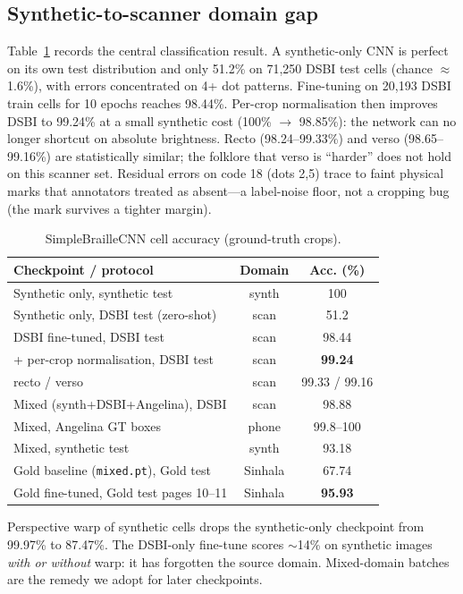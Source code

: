 \documentclass[conference]{IEEEtran}
\begin{document}
\subsection{Synthetic-to-scanner domain gap}
\label{sec:exp-dbsi}
Table~\ref{tab:cnn} records the central classification result. A
synthetic-only CNN is perfect on its own test distribution and only
51.2\% on 71{,}250 DSBI test cells (chance $\approx$1.6\%), with errors
concentrated on 4+ dot patterns. Fine-tuning on 20{,}193 DSBI train
cells for 10 epochs reaches 98.44\%. Per-crop normalisation then
improves DSBI to 99.24\% at a small synthetic cost (100\% $\rightarrow$
98.85\%): the network can no longer shortcut on absolute brightness.
Recto (98.24--99.33\%) and verso (98.65--99.16\%) are statistically
similar; the folklore that verso is ``harder'' does not hold on this
scanner set. Residual errors on code 18 (dots 2,5) trace to faint
physical marks that annotators treated as absent---a label-noise floor,
not a cropping bug (the mark survives a tighter margin).

\begin{table}[t]
\caption{SimpleBrailleCNN cell accuracy (ground-truth crops).}
\label{tab:cnn}
\centering
\begin{tabular}{lcc}
\toprule
Checkpoint / protocol & Domain & Acc. (\%) \\
\midrule
Synthetic only, synthetic test & synth & 100 \\
Synthetic only, DSBI test (zero-shot) & scan & 51.2 \\
DSBI fine-tuned, DSBI test & scan & 98.44 \\
+ per-crop normalisation, DSBI test & scan & \textbf{99.24} \\
\quad recto / verso & scan & 99.33 / 99.16 \\
Mixed (synth+DSBI+Angelina), DSBI & scan & 98.88 \\
Mixed, Angelina GT boxes & phone & 99.8--100 \\
Mixed, synthetic test & synth & 93.18 \\
Gold baseline (\texttt{mixed.pt}), Gold test & Sinhala & 67.74 \\
Gold fine-tuned, Gold test pages 10--11 & Sinhala & \textbf{95.93} \\
\bottomrule
\end{tabular}
\end{table}

Perspective warp of synthetic cells drops the synthetic-only checkpoint
from 99.97\% to 87.47\%. The DSBI-only fine-tune scores $\sim$14\% on
synthetic images \textit{with or without} warp: it has forgotten the
source domain. Mixed-domain batches are the remedy we adopt for later
checkpoints.
\end{document}
